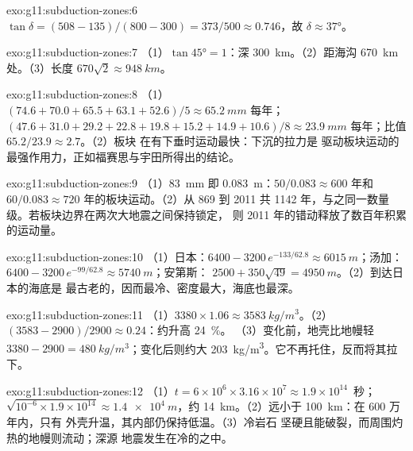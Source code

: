 \begin{solution}{exo:g11:subduction-zones:6}
$\tan\delta = (508 - 135)/(800 - 300) = 373/500 \approx 0.746$，故
$\delta \approx \ang{37}$。
\end{solution}

\begin{solution}{exo:g11:subduction-zones:7}
（1）$\tan\ang{45} = 1$：深 \qty{300}{km}。（2）距海沟
\qty{670}{km} 处。（3）长度 $670\sqrt{2} \approx \qty{948}{km}$。
\end{solution}

\begin{solution}{exo:g11:subduction-zones:8}
（1）$(74.6 + 70.0 + 65.5 + 63.1 + 52.6)/5 \approx \qty{65.2}{mm}$ 每年；
$(47.6 + 31.0 + 29.2 + 22.8 + 19.8 + 15.2 + 14.9 + 10.6)/8 \approx
\qty{23.9}{mm}$ 每年；比值 $65.2/23.9 \approx 2.7$。（2）板块
在有下垂时运动最快：下沉的拉力是
驱动板块运动的最强作用力，正如福赛思与宇田所得出的结论。
\end{solution}

\begin{solution}{exo:g11:subduction-zones:9}
（1）\qty{83}{mm} 即 \qty{0.083}{m}：$50/0.083 \approx 600$ 年和
$60/0.083 \approx 720$ 年的板块运动。（2）从 869 到 2011 共 1142
年，与之同一数量级。若板块边界在两次大地震之间保持锁定，
则 2011 年的错动释放了数百年积累的运动量。
\end{solution}

\begin{solution}{exo:g11:subduction-zones:10}
（1）日本：$6400 - 3200\,e^{-133/62.8} \approx \qty{6015}{m}$；汤加：
$6400 - 3200\,e^{-99/62.8} \approx \qty{5740}{m}$；安第斯：
$2500 + 350\sqrt{49} = \qty{4950}{m}$。（2）到达日本的海底是
最古老的，因而最冷、密度最大，海底也最深。
\end{solution}

\begin{solution}{exo:g11:subduction-zones:11}
（1）$3380 \times 1.06 \approx \qty{3583}{kg/m^3}$。（2）
$(3583 - 2900)/2900 \approx 0.24$：约升高 \qty{24}{\percent}。
（3）变化前，地壳比地幔轻
$3380 - 2900 = \qty{480}{kg/m^3}$；变化后则约大
\qty{203}{kg/m^3}。它不再托住，反而将其拉下。
\end{solution}

\begin{solution}{exo:g11:subduction-zones:12}
（1）$t = 6 \times 10^6 \times 3.16 \times 10^7 \approx 1.9 \times 10^{14}$~秒；
$\sqrt{10^{-6} \times 1.9 \times 10^{14}} \approx \qty{1.4e4}{m}$，约
\qty{14}{km}。（2）远小于 \qty{100}{km}：在 600 万年内，只有
外壳升温，其内部仍保持低温。（3）冷岩石
坚硬且能破裂，而周围灼热的地幔则流动；深源
地震发生在冷的之中。
\end{solution}

